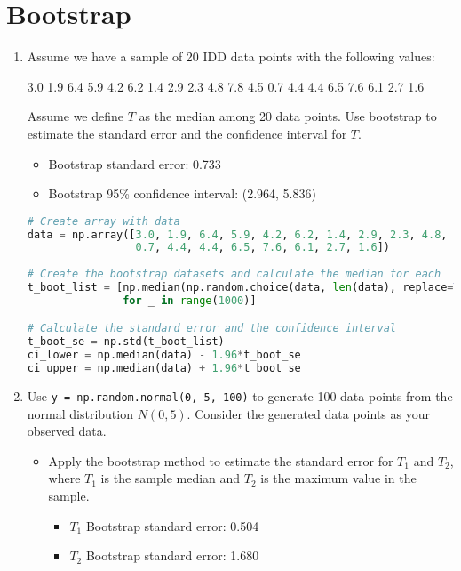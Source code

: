 \documentclass{article}
\begin{document}
\section{Bootstrap}
\begin{enumerate}[label={(\alph*)}]
    \item Assume we have a sample of 20 IDD data points with the following values:
    
    3.0 1.9 6.4 5.9 4.2 6.2 1.4 2.9 2.3 4.8 7.8 4.5
    0.7 4.4 4.4 6.5 7.6 6.1 2.7 1.6
    
    Assume we define $T$ as the median among 20 data points. Use bootstrap
    to estimate the standard error and the confidence interval for $T$.
    \begin{itemize}
        \item Bootstrap standard error: 0.733
        \item Bootstrap 95\% confidence interval: (2.964, 5.836)
    \end{itemize}
    \begin{lstlisting}[language=Python, caption=Standard Error and Confidence Interval for $T$]
# Create array with data
data = np.array([3.0, 1.9, 6.4, 5.9, 4.2, 6.2, 1.4, 2.9, 2.3, 4.8, 7.8, 4.5,
                 0.7, 4.4, 4.4, 6.5, 7.6, 6.1, 2.7, 1.6])
                 
# Create the bootstrap datasets and calculate the median for each
t_boot_list = [np.median(np.random.choice(data, len(data), replace=True))
               for _ in range(1000)]

# Calculate the standard error and the confidence interval
t_boot_se = np.std(t_boot_list)
ci_lower = np.median(data) - 1.96*t_boot_se
ci_upper = np.median(data) + 1.96*t_boot_se                 
    \end{lstlisting}
    
    \item Use \lstinline{y = np.random.normal(0, 5, 100)} to generate 100 data points from
    the normal distribution $N(0,5)$. Consider the generated data points as your observed data.
        \begin{itemize}
            \item Apply the bootstrap method to estimate the standard error for
            $T_1$ and $T_2$, where $T_1$ is the sample median and $T_2$ is the maximum
            value in the sample.
            \begin{itemize}
                \item $T_1$ Bootstrap standard error: 0.504
                \item $T_2$ Bootstrap standard error: 1.680
            \end{itemize}
            

\end{itemize}
\end{enumerate}
\end{document}
